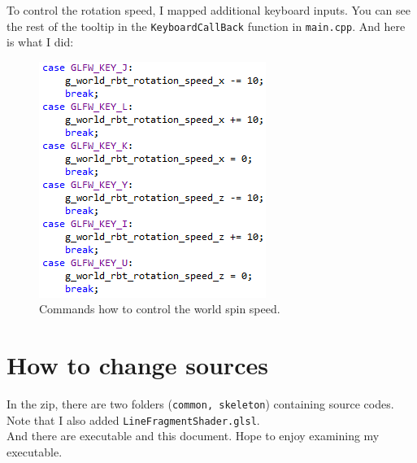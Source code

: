 \documentclass[11pt]{article}
\begin{document}
To control the rotation speed, I mapped additional keyboard inputs. You can see the rest of the tooltip in the \texttt{KeyboardCallBack} function in \texttt{main.cpp}. And here is what I did:
\begin{figure}[htb]
	\begin{center}
		\includegraphics[width=0.5\linewidth]{command2.png}
	\end{center}
	\caption{Commands how to control the world spin speed.}
\end{figure}

\section{How to change sources}
In the zip, there are two folders (\texttt{common, skeleton}) containing source codes. Note that I also added \texttt{LineFragmentShader.glsl}. \\
And there are executable and this document. Hope to enjoy examining my executable.







\end{document}

